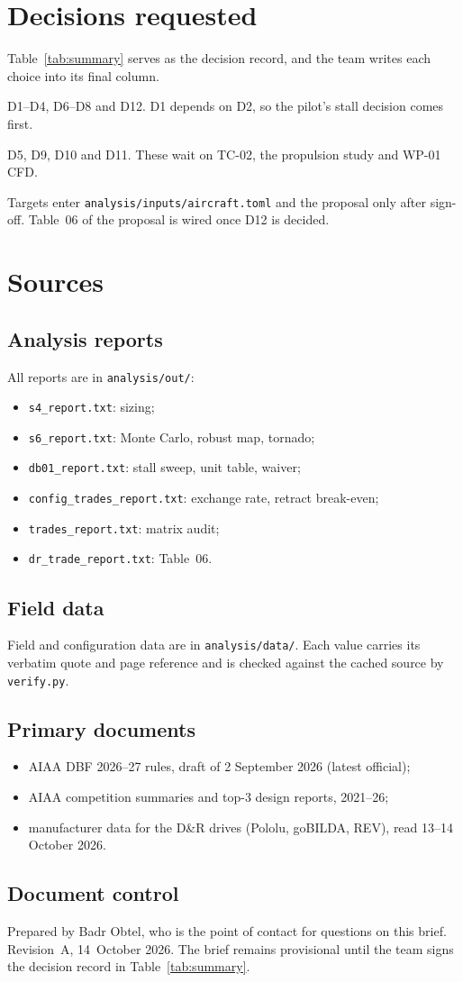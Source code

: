 \documentclass[final]{dbfdoc}
\begin{document}
\section{Decisions requested}\label{sec:decide}
Table~\ref{tab:summary} serves as the decision record, and the team writes each choice into its final column.

D1--D4, D6--D8 and D12. D1 depends on D2, so the pilot's stall decision comes first.

D5, D9, D10 and D11. These wait on TC-02, the propulsion study and WP-01 CFD.

Targets enter \texttt{analysis/inputs/aircraft.toml} and the proposal only after sign-off. Table~06 of the proposal is wired once D12 is decided.

\section{Sources}
\subsection{Analysis reports}
All reports are in \texttt{analysis/out/}:
\begin{itemize}
\item \texttt{s4\_report.txt}: sizing;
\item \texttt{s6\_report.txt}: Monte Carlo, robust map, tornado;
\item \texttt{db01\_report.txt}: stall sweep, unit table, waiver;
\item \texttt{config\_trades\_report.txt}: exchange rate, retract break-even;
\item \texttt{trades\_report.txt}: matrix audit;
\item \texttt{dr\_trade\_report.txt}: Table~06.
\end{itemize}

\subsection{Field data}
Field and configuration data are in \texttt{analysis/data/}. Each value carries its verbatim quote and page reference and is checked against the cached source by \texttt{verify.py}.

\subsection{Primary documents}
\begin{itemize}
\item AIAA DBF 2026--27 rules, draft of 2 September 2026 (latest official);
\item AIAA competition summaries and top-3 design reports, 2021--26;
\item manufacturer data for the D\&R drives (Pololu, goBILDA, REV), read 13--14 October 2026.
\end{itemize}

\subsection{Document control}
Prepared by Badr Obtel, who is the point of contact for questions on this brief. Revision~A, 14~October 2026. The brief remains provisional until the team signs the decision record in Table~\ref{tab:summary}.
\end{document}
